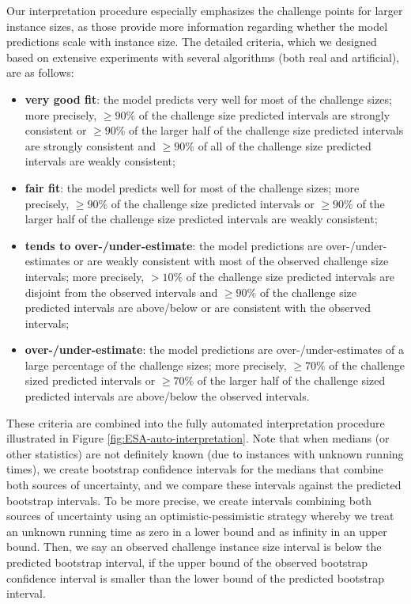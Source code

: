 \documentclass[aic]{iosart2x}
\begin{document}
Our interpretation procedure especially emphasizes the challenge points for larger instance sizes, as those provide more information regarding whether the model predictions scale with instance size. The detailed criteria, which we designed based on extensive experiments with several algorithms (both real and artificial), are as follows:
\begin{itemize}
\item \textbf{very good fit}: the model predicts very well for most of the challenge sizes; more precisely, $\geq 90\%$ of the challenge size predicted intervals are strongly consistent or $\geq 90\%$ of the larger half of the challenge size predicted intervals are strongly consistent and $ \geq 90\%$ of all of the challenge size predicted intervals are weakly consistent;

\item \textbf{fair fit}: the model predicts well for most of the challenge sizes; more precisely, $\geq 90\%$ of the challenge size predicted intervals or $\geq 90\%$ of the larger half of the challenge size predicted intervals are weakly consistent;

\item \textbf{tends to over-/under-estimate}: the model predictions are over-/under-estimates or are weakly consistent with most of the observed challenge size intervals; more precisely, $> 10\%$ of the challenge size predicted intervals are disjoint from the observed intervals and $\geq 90\%$ of the challenge size predicted intervals are above/below or are consistent with the observed intervals;

\item \textbf{over-/under-estimate}: the model predictions are over-/under-estimates of a large percentage of the challenge sizes; more precisely, $\geq 70\%$ of the challenge sized predicted intervals or $\geq 70\%$ of the larger half of the challenge sized predicted intervals are above/below the observed intervals.

\end{itemize}
These criteria are combined into the fully automated interpretation procedure illustrated in Figure \ref{fig:ESA-auto-interpretation}. Note that when medians (or other statistics) are not definitely known (due to instances with unknown running times), we create bootstrap confidence intervals for the medians that combine both sources of uncertainty, and we compare these intervals against the predicted bootstrap intervals. To be more precise, we create intervals combining both sources of uncertainty using an optimistic-pessimistic strategy whereby we treat an unknown running time as zero in a lower bound and as infinity in an upper bound. Then, we say an observed challenge instance size interval is below the predicted bootstrap interval, if the upper bound of the observed bootstrap confidence interval is smaller than the lower bound of the predicted bootstrap interval.
\end{document}
